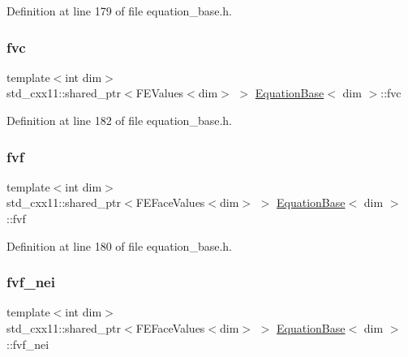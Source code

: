 Definition at line 179 of file equation\+\_\+base.\+h.

\mbox{\label{class_equation_base_a04c2626e352fcc6b1c24c50a7e899c2f}} 
\subsubsection{\texorpdfstring{fvc}{fvc}}
{\footnotesize\ttfamily template$<$int dim$>$ \\
std\+\_\+cxx11\+::shared\+\_\+ptr$<$F\+E\+Values$<$dim$>$ $>$ \hyperlink{class_equation_base}{Equation\+Base}$<$ dim $>$\+::fvc\hspace{0.3cm}{\ttfamily [protected]}}



Definition at line 182 of file equation\+\_\+base.\+h.

\mbox{\label{class_equation_base_a80b624dc27281e2758918d83fd38daf4}} 
\subsubsection{\texorpdfstring{fvf}{fvf}}
{\footnotesize\ttfamily template$<$int dim$>$ \\
std\+\_\+cxx11\+::shared\+\_\+ptr$<$F\+E\+Face\+Values$<$dim$>$ $>$ \hyperlink{class_equation_base}{Equation\+Base}$<$ dim $>$\+::fvf\hspace{0.3cm}{\ttfamily [protected]}}



Definition at line 180 of file equation\+\_\+base.\+h.

\mbox{\label{class_equation_base_abd53ef2bf719d3f8e72881072383180c}} 
\subsubsection{\texorpdfstring{fvf\+\_\+nei}{fvf\_nei}}
{\footnotesize\ttfamily template$<$int dim$>$ \\
std\+\_\+cxx11\+::shared\+\_\+ptr$<$F\+E\+Face\+Values$<$dim$>$ $>$ \hyperlink{class_equation_base}{Equation\+Base}$<$ dim $>$\+::fvf\+\_\+nei\hspace{0.3cm}{\ttfamily [protected]}}



